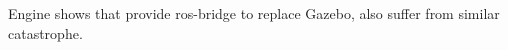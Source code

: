 \documentclass[aps,pra,twocolumn,notitlepage,nofootinbib,superscriptaddress]{revtex4-1}
\begin{document}
Engine shows that provide ros-bridge to replace Gazebo, also suffer from similar catastrophe.
%
\end{document}
